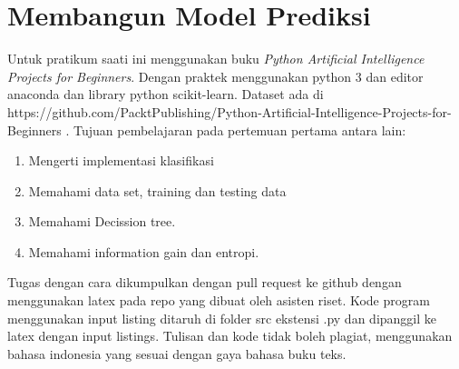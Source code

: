 \chapter{Membangun Model Prediksi}

Untuk pratikum saati ini menggunakan buku \textit{Python Artificial Intelligence Projects for Beginners}\cite{eckroth2018python}. Dengan praktek menggunakan python 3 dan editor anaconda dan library python scikit-learn.
Dataset ada di https://github.com/PacktPublishing/Python-Artificial-Intelligence-Projects-for-Beginners .
Tujuan pembelajaran pada pertemuan pertama antara lain:
\begin{enumerate}
	\item
	      Mengerti implementasi klasifikasi
	\item
	      Memahami data set, training dan testing data
	\item
	      Memahami Decission tree.
	\item
	      Memahami information gain dan entropi.
\end{enumerate}
Tugas dengan cara dikumpulkan dengan pull request ke github dengan menggunakan latex pada repo yang dibuat oleh asisten riset. Kode program menggunakan input listing ditaruh di folder src ekstensi .py dan dipanggil ke latex dengan input listings. Tulisan dan kode tidak boleh plagiat, menggunakan bahasa indonesia yang sesuai dengan gaya bahasa buku teks.

